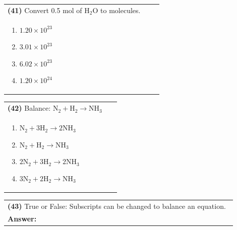 \documentclass{article}
\begin{document}
\vspace{0.2cm}
\noindent \begin{tabular}{|p{0.9\linewidth}|}
\hline
\vspace{0.2cm}
\textbf{(41)} Convert 0.5 mol of $\mathrm{H_2O}$ to molecules.\\
\begin{minipage}[t]{0.85\linewidth}
\begin{enumerate}[label=\alph*.]
\item $1.20\times10^{23}$
\item $3.01\times10^{23}$
\item $6.02\times10^{23}$
\item $1.20\times10^{24}$
\end{enumerate}
\end{minipage}\\
\hline
\end{tabular}

\vspace{0.2cm}
\noindent \begin{tabular}{|p{0.9\linewidth}|}
\hline
\vspace{0.2cm}
\textbf{(42)} Balance: $\mathrm{N_2 + H_2 \rightarrow NH_3}$\\
\begin{minipage}[t]{0.85\linewidth}
\begin{enumerate}[label=\alph*.]
\item $\mathrm{N_2 + 3H_2 \rightarrow 2NH_3}$
\item $\mathrm{N_2 + H_2 \rightarrow NH_3}$
\item $\mathrm{2N_2 + 3H_2 \rightarrow 2NH_3}$
\item $\mathrm{3N_2 + 2H_2 \rightarrow NH_3}$
\end{enumerate}
\end{minipage}\\
\hline
\end{tabular}

\vspace{0.2cm}
\noindent \begin{tabular}{|p{0.9\linewidth}|}
\hline
\vspace{0.2cm}
\textbf{(43)} True or False: Subscripts can be changed to balance an equation.\\
\textbf{Answer:} \underline{\hspace{2cm}}\\
\hline
\end{tabular}
\end{document}
